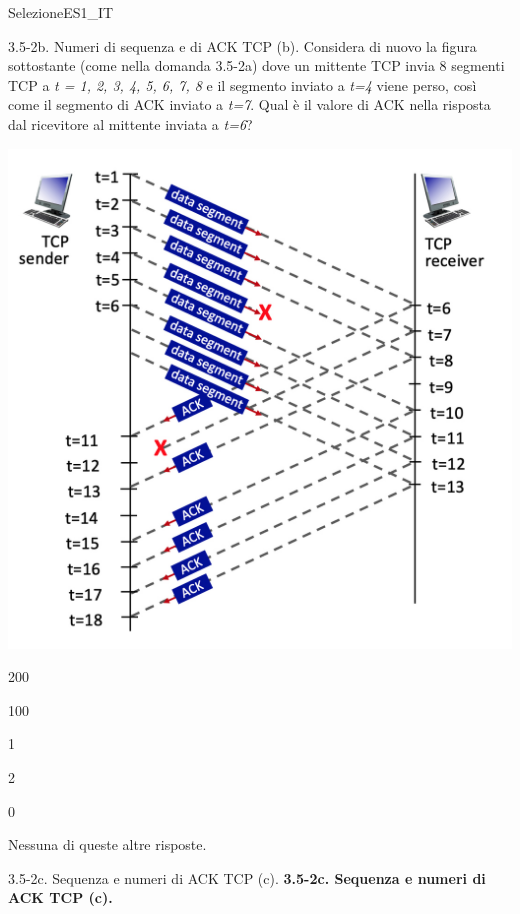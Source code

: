 \documentclass[a4paper]{article}
\begin{document}
\begin{quiz}{SelezioneES1\_IT}
\begin{multi}[points=1,shuffle]{3.5-2b. Numeri di sequenza e di ACK TCP (b).}
Considera di nuovo la figura sottostante (come nella domanda 3.5-2a) dove un mittente TCP invia 8 segmenti TCP a \emph{t = 1, 2, 3, 4, 5, 6, 7, 8} e il segmento inviato a \emph{t=4} viene perso, così come il segmento di ACK inviato a \emph{t=7}. Qual è il valore di ACK nella risposta dal ricevitore al mittente inviata a \emph{t=6}?
\begin{center}
	\includegraphics[width=\linewidth]{figs/tcp_seq_ack_1.jpg}
\end{center}
\item 200
\item* 100
\item 1
\item 2
\item 0
\item Nessuna di queste altre risposte.
\end{multi}

\begin{multi}[points=1,shuffle]{3.5-2c. Sequenza e numeri di ACK TCP (c).}
\textbf{3.5-2c. Sequenza e numeri di ACK TCP (c).}


\end{multi}
\end{quiz}
\end{document}

